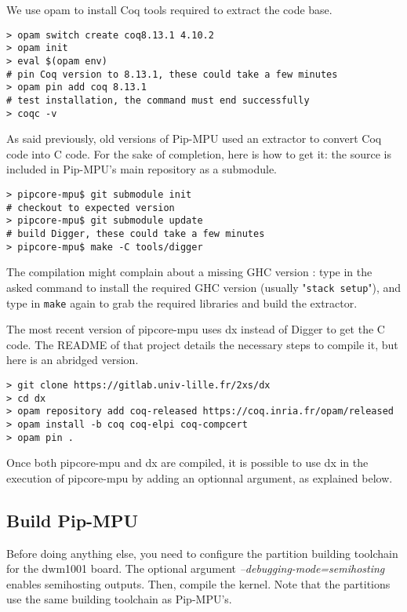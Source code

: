 \documentclass[10pt,a4paper,titlepage]{refart}
\begin{document}

We use opam to install Coq tools required to extract the code base.

\begin{lstlisting}[style=BashStyle]
> opam switch create coq8.13.1 4.10.2
> opam init
> eval $(opam env)
# pin Coq version to 8.13.1, these could take a few minutes
> opam pin add coq 8.13.1
# test installation, the command must end successfully
> coqc -v
\end{lstlisting}

As said previously, old versions of Pip-MPU used an extractor to convert Coq code into C code.
For the sake of completion, here is how to get it: the source is included in Pip-MPU's main repository as a submodule.
\begin{lstlisting}[style=BashStyle]
> pipcore-mpu$ git submodule init
# checkout to expected version
> pipcore-mpu$ git submodule update
# build Digger, these could take a few minutes
> pipcore-mpu$ make -C tools/digger
\end{lstlisting}
The compilation might complain about a missing GHC version : type in the asked command to install the required GHC version (usually "\texttt{stack setup}"), and type in \texttt{make} again to grab the required libraries and build the extractor.

The most recent version of pipcore-mpu uses dx instead of Digger to get the C code. The README 
of that project details the necessary steps to compile it, but here is an abridged version.

\begin{lstlisting}[style=BashStyle]
> git clone https://gitlab.univ-lille.fr/2xs/dx
> cd dx
> opam repository add coq-released https://coq.inria.fr/opam/released
> opam install -b coq coq-elpi coq-compcert
> opam pin .
\end{lstlisting}

Once both pipcore-mpu and dx are compiled, it is possible to use dx in the execution of pipcore-mpu by adding an optionnal argument, as explained below.

\subsection{Build Pip-MPU} \label{buildpip}
Before doing anything else, you need to configure the partition building toolchain for the dwm1001 board.
The optional argument \textit{--debugging-mode=semihosting} enables semihosting outputs.
Then, compile the kernel.
Note that the partitions use the same building toolchain as Pip-MPU's.
\end{document}
